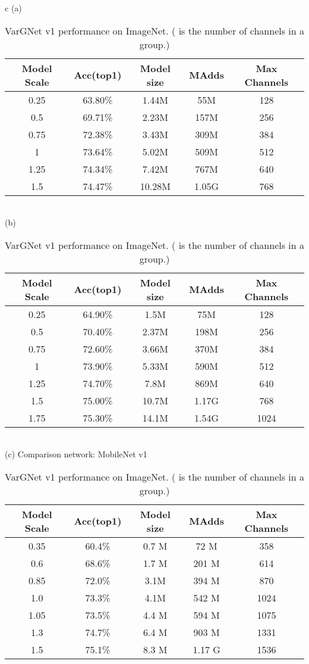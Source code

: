 \documentclass{article}
\begin{document}
\begin{table}
  \centering
  \caption{VarGNet v1 performance on ImageNet. ( is the number of channels in a group.)}\label{tab:vargnetv1_comp}
  \begin{tabular}{c}
    (a)  \\
    \begin{tabular}{ccccc}
      \toprule
      Model Scale & Acc(top1) & Model size & MAdds & Max Channels \\ \midrule
      0.25 & 63.80\% & 1.44M & 55M & 128\\
      0.5 & 69.71\% & 2.23M & 157M & 256\\
      0.75 & 72.38\% & 3.43M & 309M & 384\\
      1 & 73.64\% & 5.02M & 509M & 512\\
      1.25 & 74.34\% & 7.42M & 767M & 640\\
      1.5 & 74.47\% & 10.28M & 1.05G & 768\\
\bottomrule
    \end{tabular} \\
    (b)  \\
    \begin{tabular}{ccccc}
      \toprule
      Model Scale & Acc(top1) & Model size & MAdds & Max Channels \\ \midrule
      0.25 & 64.90\% & 1.5M & 75M & 128 \\
      0.5 & 70.40\% & 2.37M & 198M & 256 \\
      0.75 & 72.60\% & 3.66M & 370M & 384 \\
      1 & 73.90\% & 5.33M & 590M & 512 \\
      1.25 & 74.70\% & 7.8M & 869M & 640 \\
      1.5 & 75.00\% & 10.7M & 1.17G & 768 \\
      1.75 & 75.30\% & 14.1M & 1.54G & 1024 \\
\bottomrule
    \end{tabular} \\
    (c) Comparison network: MobileNet v1\\
    \begin{tabular}{ccccc}
      \toprule
      Model Scale & Acc(top1) & Model size & MAdds & Max Channels \\ \midrule
      0.35 & 60.4\% & 0.7 M & 72 M & 358 \\
      0.6 & 68.6\% & 1.7 M & 201 M & 614 \\
      0.85 & 72.0\% & 3.1M & 394 M & 870  \\
      1.0 & 73.3\% & 4.1M & 542 M & 1024  \\
      1.05 & 73.5\% & 4.4 M & 594 M & 1075 \\
      1.3 & 74.7\% & 6.4 M & 903 M & 1331 \\
      1.5 & 75.1\% & 8.3 M & 1.17 G & 1536  \\
\bottomrule
    \end{tabular}
  \end{tabular}
\end{table}
\end{document}
